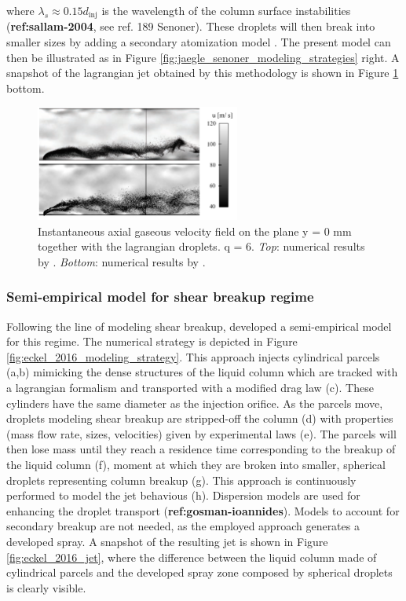 where $\lambda_s \approx 0.15 d_\mathrm{inj}$ is the wavelength of the column surface instabilities (\textbf{ref:sallam-2004}, see ref. 189 Senoner). These droplets will then break into smaller sizes by adding a secondary atomization model . The present model can then be illustrated as in Figure \ref{fig:jaegle_senoner_modeling_strategies} right. A snapshot of the lagrangian jet obtained by this methodology is shown in Figure \ref{fig:jaegle_senoner_lagrangian_fields} bottom.


\begin{figure}[ht]
    \centering
    \includegraphics[width=0.6\textwidth]{./part1_numerical_approaches/figures_ch3/jaegle_senoner_lagrangian_fields}
       \centering
    \caption{Instantaneous axial gaseous velocity field on the plane y = 0 mm together with the lagrangian
droplets. q = 6. \textsl{Top}: numerical results by . \textsl{Bottom}: numerical results by .}
    \label{fig:jaegle_senoner_lagrangian_fields}
\end{figure}

\subsubsection*{Semi-empirical model for shear breakup regime }

Following the line of modeling shear breakup,  developed a semi-empirical model for this regime. The numerical strategy is depicted in Figure \ref{fig:eckel_2016_modeling_strategy}. This approach injects cylindrical parcels (a,b) mimicking the dense structures of the liquid column which are tracked with a lagrangian formalism and transported with a modified drag law (c). These cylinders have the same diameter as the injection orifice.  As the parcels move, droplets modeling shear breakup are stripped-off the column (d) with properties (mass flow rate, sizes, velocities) given by experimental laws (e). The parcels will then lose mass until they reach a residence time corresponding to the breakup of the liquid column (f), moment at which they are broken into smaller, spherical droplets representing column breakup (g). This approach is continuously performed to model the jet behavious (h). Dispersion models are used for enhancing the droplet transport (\textbf{ref:gosman-ioannides}). Models to account for secondary breakup are not needed, as the employed approach generates a developed spray. A snapshot of the resulting jet is shown in Figure \ref{fig:eckel_2016_jet}, where the difference between the liquid column made of cylindrical parcels and the developed spray zone composed by spherical droplets is clearly visible. 

